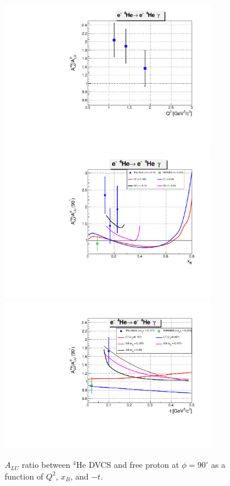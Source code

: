 \begin{enumerate}
  \begin{figure}[tbp]
    \includegraphics[height=6.6cm]{fig/BSA_ratio_coh_Q2.pdf}
    \includegraphics[height=6.6cm]{fig/BSA_ratio_coh_x.pdf}
    \centering
    \includegraphics[height=6.6cm]{fig/BSA_ratio_coh_t.pdf}
    \caption{ $A_{LU}$ ratio between $^{4}$He DVCS and free proton at $\phi = 
    90 ^{\circ}$ as a function of $Q^{2}$, $x_{B}$, and $-t$.}
    \label{fig:coh-alu-ratios}
    \end{figure}


\end{enumerate}
